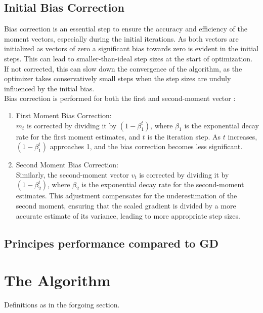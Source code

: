 \documentclass[journal]{IEEEtran}
\begin{document}
\subsection{Initial Bias Correction}
Bias correction is an essential step to ensure the accuracy and efficiency of the moment vectors, especially during the initial iterations. As both vectors are initialized as vectors of zero a significant bias towards zero is evident in the initial steps. This can lead to smaller-than-ideal step sizes at the start of optimization. If not corrected, this can slow down the convergence of the algorithm, as the optimizer takes conservatively small steps when the step sizes are unduly influenced by the initial bias.\\
Bias correction is performed for both the first and second-moment vector :
\begin{enumerate}
    \item First Moment Bias Correction:\\
    \(m_t\) is corrected by dividing it by \((1 - \beta_1^t)\), where \(\beta_1\) is the exponential decay rate for the first moment estimates, and \(t\) is the iteration step. As \(t\) increases, \((1 - \beta_1^t)\) approaches 1, and the bias correction becomes less significant.
    \item Second Moment Bias Correction:\\
    Similarly, the second-moment vector \(v_t\) is corrected by dividing it by \((1 - \beta_2^t)\), where \(\beta_2\) is the exponential decay rate for the second-moment estimates. This adjustment compensates for the underestimation of the second moment, ensuring that the scaled gradient is divided by a more accurate estimate of its variance, leading to more appropriate step sizes.
\end{enumerate}

\subsection{Principes performance compared to GD}
\section{The Algorithm}
Definitions as in the forgoing section.
\end{document}
